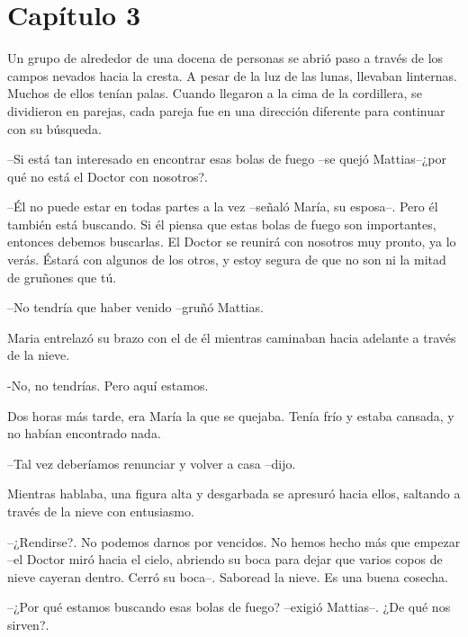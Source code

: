\chapter*{Capítulo 3}

Un grupo de alrededor de una docena de personas se abrió paso a través de los campos nevados hacia la cresta. A pesar de la luz de las lunas, llevaban linternas. Muchos de ellos tenían palas. Cuando llegaron a la cima de la cordillera, se dividieron en parejas, cada pareja fue  en una dirección diferente para continuar con su búsqueda.



--Si está tan interesado en encontrar esas bolas de fuego --se quejó Mattias--¿por qué no está el Doctor con nosotros?.


--Él no puede estar en todas partes a la vez --señaló María, su esposa--. Pero él también está buscando. Si él piensa que estas bolas de fuego son importantes, entonces debemos buscarlas. El Doctor se reunirá con nosotros muy pronto, ya lo verás. Éstará con algunos de los otros, y estoy segura de que no son ni la mitad de gruñones que tú.



--No tendría que haber venido --gruñó Mattias.



Maria entrelazó su brazo con el de él mientras caminaban hacia adelante a través de la nieve. 


-No, no tendrías. Pero aquí estamos.



Dos horas más tarde, era María la que se quejaba. Tenía frío y estaba cansada, y no habían encontrado nada. 


--Tal vez deberíamos renunciar y volver a casa --dijo.



Mientras hablaba, una figura alta y desgarbada se apresuró hacia ellos, saltando a través de la nieve con entusiasmo.



--¿Rendirse?. No podemos darnos por vencidos. No hemos hecho más que empezar --el Doctor miró hacia el cielo, abriendo su boca para dejar que varios copos de nieve cayeran dentro. Cerró su boca--. Saboread la nieve. Es una buena cosecha.



--¿Por qué estamos buscando esas bolas de fuego? --exigió Mattias--. ¿De qué nos sirven?.



